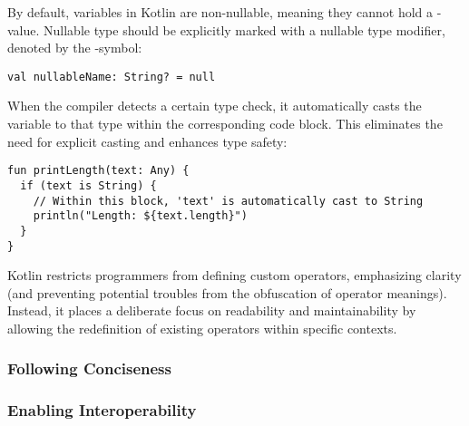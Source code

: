 \noindent By default, variables in Kotlin are non-nullable, meaning they cannot hold a -value. Nullable type 
should be explicitly marked with a nullable type modifier, denoted by the -symbol:

\begin{lstlisting}
val nullableName: String? = null
\end{lstlisting}

\noindent When the compiler detects a certain type check, it automatically casts the variable to that type within the 
corresponding code block. This eliminates the need for explicit casting and enhances type safety:

\begin{lstlisting}
fun printLength(text: Any) {
  if (text is String) {
    // Within this block, 'text' is automatically cast to String
    println("Length: ${text.length}")
  }
}
\end{lstlisting}

\noindent Kotlin restricts programmers from defining custom operators, emphasizing clarity (and preventing potential 
troubles from the obfuscation of operator meanings). Instead, it places a deliberate focus on readability and 
maintainability by allowing the redefinition of existing operators within specific contexts.


\subsubsection{Following Conciseness}



\subsubsection{Enabling Interoperability}

